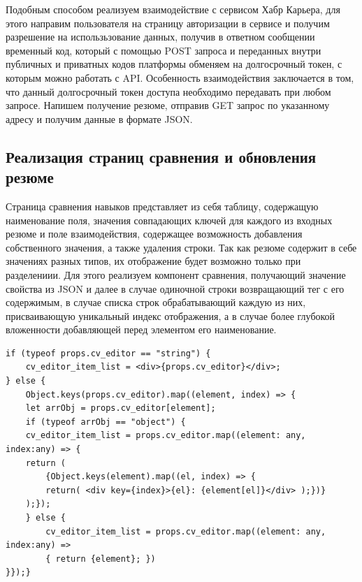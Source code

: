 \documentclass[master, och, diploma]{SCWorks}
\begin{document}
Подобным способом реализуем взаимодействие с сервисом Хабр Карьера, для этого направим пользователя на страницу авторизации в сервисе и получим разрешение на использьзование данных, получив в ответном сообщении временный код, который с помощью POST запроса и переданных внутри публичных и приватных кодов платформы обменяем на долгосрочный токен, с которым можно работать с API. Особенность взаимодействия заключается в том, что данный долгосрочный токен доступа необходимо передавать при любом запросе. Напишем получение резюме, отправив GET запрос по указанному адресу и получим данные в формате JSON.



\subsection{Реализация страниц сравнения и обновления резюме}
Страница сравнения навыков представляет из себя таблицу, содержащую наименование поля, значения совпадающих ключей для каждого из входных резюме и поле взаимодействия, содержащее возможность добавления собственного значения, а также удаления строки. Так как резюме содержит в себе значениях разных типов, их отображение будет возможно только при разделениии. Для этого реализуем компонент сравнения, получающий значение свойства из JSON и далее в случае одиночной строки возвращающий тег с его содержимым, в случае списка строк обрабатывающий каждую из них, присваивающую уникальный индекс отображения, а в случае более глубокой вложенности добавляющей перед элементом его наименование.
\begin{verbatim}
if (typeof props.cv_editor == "string") {
    cv_editor_item_list = <div>{props.cv_editor}</div>;
} else {
    Object.keys(props.cv_editor).map((element, index) => {
    let arrObj = props.cv_editor[element];
    if (typeof arrObj == "object") {
    cv_editor_item_list = props.cv_editor.map((element: any, index:any) => {
    return (
        {Object.keys(element).map((el, index) => {
        return( <div key={index}>{el}: {element[el]}</div> );})}
    );});  
    } else {
        cv_editor_item_list = props.cv_editor.map((element: any, index:any) => 
        { return {element}; })
}});}
\end{verbatim}
\end{document}
